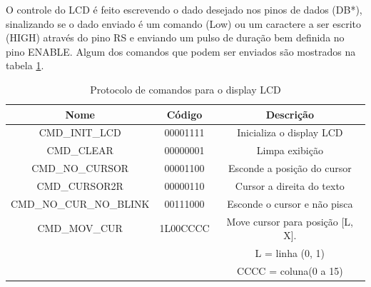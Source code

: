 \documentclass{article}
\begin{document}
O controle do LCD é feito escrevendo o dado desejado nos pinos de dados (DB*), sinalizando se o dado enviado é um comando (Low) ou um caractere a ser escrito (HIGH) através do pino RS e enviando um pulso de duração bem definida no pino ENABLE. Algum dos comandos que podem ser enviados são mostrados na tabela \ref{tab:lcd_commands}.
\begin{table}[H]
	\centering
	\caption{Protocolo de comandos para o display LCD}
	\label{tab:lcd_commands}
	\begin{tabular}{|c|c|c|}
		\hline \bfseries{Nome} & \bfseries{Código} & \bfseries{Descrição} \\
		\hline CMD\_INIT\_LCD & 00001111 & Inicializa o display LCD \\
		\hline CMD\_CLEAR & 00000001 & Limpa exibição\\
		\hline CMD\_NO\_CURSOR & 00001100 & Esconde a posição do cursor\\
		\hline CMD\_CURSOR2R & 00000110 & Cursor a direita do texto\\
		\hline CMD\_NO\_CUR\_NO\_BLINK & 00111000 & Esconde o cursor e não pisca\\
		\hline CMD\_MOV\_CUR & 1L00CCCC & Move cursor para posição [L, X].\\
			& & L = linha (0, 1)\\
			& & CCCC = coluna(0 a 15)\\
		\hline
	\end{tabular}
\end{table}
\end{document}

